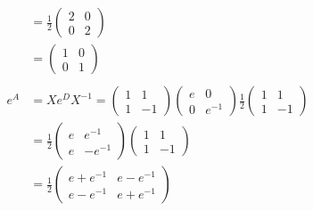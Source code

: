\documentclass{article}
\begin{document}
\begin{align*}
    &= \frac{1}{2} \begin{pmatrix} 2 & 0 \\ 0 & 2 \end{pmatrix} \\
    &= \begin{pmatrix} 1 & 0 \\ 0 & 1 \end{pmatrix} \\
    \\
    e^A &= Xe^DX^{-1} = \begin{pmatrix} 1 & 1 \\ 1 & -1 \end{pmatrix} \begin{pmatrix} e & 0 \\ 0 & e^{-1} \end{pmatrix} \frac{1}{2} \begin{pmatrix} 1 & 1 \\ 1 & -1 \end{pmatrix} \\
    &= \frac{1}{2} \begin{pmatrix} e & e^{-1} \\ e & -e^{-1} \end{pmatrix} \begin{pmatrix} 1 & 1 \\ 1 & -1 \end{pmatrix} \\
    &= \frac{1}{2} \begin{pmatrix} e + e^{-1} & e - e^{-1} \\ e - e^{-1} & e + e^{-1} \end{pmatrix} \\
\end{align*}
\end{document}
